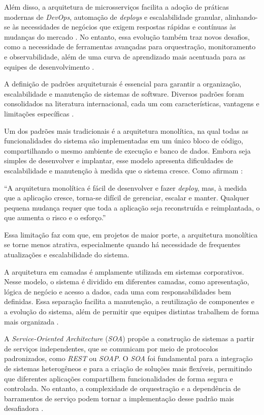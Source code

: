 Além disso, a arquitetura de microsserviços facilita a adoção de práticas modernas de \textit{DevOps}, automação de \textit{deploys} e escalabilidade granular, alinhando-se às necessidades de negócios que exigem respostas rápidas e contínuas às mudanças do mercado \cite{shekhar2023microservices}. No entanto, essa evolução também traz novos desafios, como a necessidade de ferramentas avançadas para orquestração, monitoramento e observabilidade, além de uma curva de aprendizado mais acentuada para as equipes de desenvolvimento \cite{jamshidi2016systematic}. 

A definição de padrões arquiteturais é essencial para garantir a organização, escalabilidade e manutenção de sistemas de software. Diversos padrões foram consolidados na literatura internacional, cada um com características, vantagens e limitações específicas \cite{jamshidi2016systematic}. 

Um dos padrões mais tradicionais é a arquitetura monolítica, na qual todas as funcionalidades do sistema são implementadas em um único bloco de código, compartilhando o mesmo ambiente de execução e banco de dados. Embora seja simples de desenvolver e implantar, esse modelo apresenta dificuldades de escalabilidade e manutenção à medida que o sistema cresce. Como afirmam \cite{nizami2020comparison}: 

“A arquitetura monolítica é fácil de desenvolver e fazer \textit{deploy}, mas, à medida que a aplicação cresce, torna-se difícil de gerenciar, escalar e manter. Qualquer pequena mudança requer que toda a aplicação seja reconstruída e reimplantada, o que aumenta o risco e o esforço.” 

Essa limitação faz com que, em projetos de maior porte, a arquitetura monolítica se torne menos atrativa, especialmente quando há necessidade de frequentes atualizações e escalabilidade do sistema. 

A arquitetura em camadas é amplamente utilizada em sistemas corporativos. Nesse modelo, o sistema é dividido em diferentes camadas, como apresentação, lógica de negócio e acesso a dados, cada uma com responsabilidades bem definidas. Essa separação facilita a manutenção, a reutilização de componentes e a evolução do sistema, além de permitir que equipes distintas trabalhem de forma mais organizada \cite{jamshidi2016systematic}. 

A \textit{Service-Oriented Architecture} (\textit{SOA}) propõe a construção de sistemas a partir de serviços independentes, que se comunicam por meio de protocolos padronizados, como \textit{REST} ou \textit{SOAP}. O \textit{SOA} foi fundamental para a integração de sistemas heterogêneos e para a criação de soluções mais flexíveis, permitindo que diferentes aplicações compartilhem funcionalidades de forma segura e controlada. No entanto, a complexidade de orquestração e a dependência de barramentos de serviço podem tornar a implementação desse padrão mais desafiadora \cite{jamshidi2016systematic}. 

